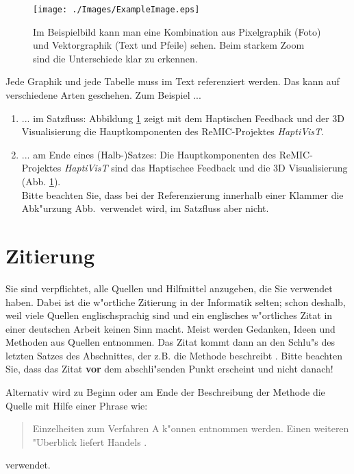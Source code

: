 \documentclass[12pt,a4paper,headinclude,twoside, plainheadsepline, open=right,numbers=noenddot]{scrreprt}
\begin{document}
\begin{figure}[tb]
\begin{center}
 \texttt{[image: ./Images/ExampleImage.eps]}
\caption{{Im Beispielbild kann man eine Kombination aus Pixelgraphik (Foto) und Vektorgraphik (Text und Pfeile) sehen.
Beim starkem Zoom sind die Unterschiede klar zu erkennen.}\label{beispielbild}}
\end{center}
\end{figure}

Jede Graphik und jede Tabelle muss im Text referenziert werden.
Das kann auf verschiedene Arten geschehen. Zum Beispiel ...
\begin{enumerate}
\item ... im Satzfluss: Abbildung \ref{beispielbild} zeigt mit dem Haptischen Feedback und der 3D Visualisierung die Hauptkomponenten des ReMIC-Projektes \emph{HaptiVisT}.
\item ... am Ende eines (Halb-)Satzes:  Die Hauptkomponenten des ReMIC-Projektes \emph{HaptiVisT} sind das Haptischee Feedback und die 3D Visualisierung (Abb. \ref{beispielbild}).\\
Bitte beachten Sie, dass bei der Referenzierung innerhalb einer Klammer die Abk"urzung Abb.~verwendet wird, im Satzfluss aber nicht.
\end{enumerate}


\section{Zitierung}\label{zitierung}

Sie sind verpflichtet, alle Quellen und Hilfmittel anzugeben, die Sie verwendet haben.
Dabei ist die w"ortliche Zitierung in der Informatik selten; schon deshalb, weil viele Quellen englischsprachig sind und ein englisches w"ortliches Zitat in einer deutschen Arbeit keinen Sinn macht.
Meist werden Gedanken, Ideen und Methoden aus Quellen entnommen.
Das Zitat kommt dann an den Schlu"s des letzten Satzes des Abschnittes, der z.B. die Methode beschreibt \cite{szalo2015graphmic}.
Bitte beachten Sie, dass das Zitat \textbf{vor} dem abschli"senden Punkt erscheint und nicht danach!

Alternativ wird zu Beginn oder am Ende der Beschreibung der Methode die Quelle mit Hilfe einer Phrase wie:
\begin{quote}
Einzelheiten zum Verfahren A k"onnen \cite{palm2004color} entnommen werden.
Einen weiteren "Uberblick liefert Handels \cite{handels2000medizinische}.
\end{quote}
verwendet.
\end{document}
